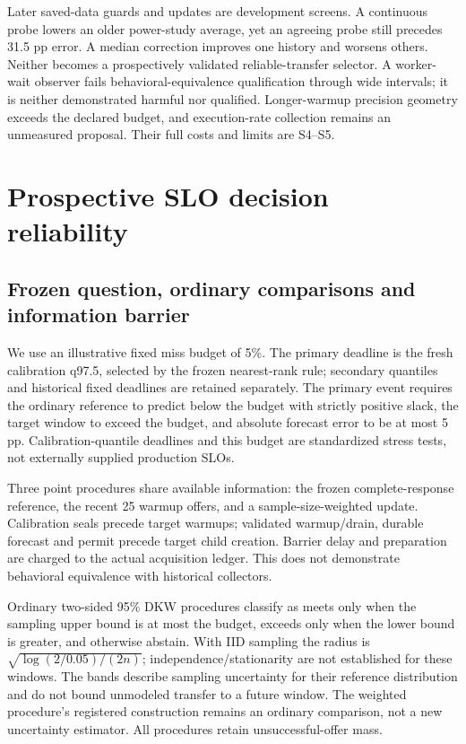\documentclass[10pt,a4paper]{article}
\begin{document}
Later saved-data guards and updates are development screens. A continuous probe lowers an older power-study average, yet an agreeing probe still precedes 31.5 pp error. A median correction improves one history and worsens others. Neither becomes a prospectively validated reliable-transfer selector. A worker-wait observer fails behavioral-equivalence qualification through wide intervals; it is neither demonstrated harmful nor qualified. Longer-warmup precision geometry exceeds the declared budget, and execution-rate collection remains an unmeasured proposal. Their full costs and limits are S4–S5.

\section{Prospective SLO decision reliability}

\subsection{Frozen question, ordinary comparisons and information barrier}

We use an illustrative fixed miss budget of 5\%. The primary deadline is the fresh calibration q97.5, selected by the frozen nearest-rank rule; secondary quantiles and historical fixed deadlines are retained separately. The primary event requires the ordinary reference to predict below the budget with strictly positive slack, the target window to exceed the budget, and absolute forecast error to be at most 5 pp. Calibration-quantile deadlines and this budget are standardized stress tests, not externally supplied production SLOs.

Three point procedures share available information: the frozen complete-response reference, the recent 25 warmup offers, and a sample-size-weighted update. Calibration seals precede target warmups; validated warmup/drain, durable forecast and permit precede target child creation. Barrier delay and preparation are charged to the actual acquisition ledger. This does not demonstrate behavioral equivalence with historical collectors.

Ordinary two-sided 95\% DKW procedures classify as meets only when the sampling upper bound is at most the budget, exceeds only when the lower bound is greater, and otherwise abstain. With IID sampling the radius is \(\sqrt{\log(2/0.05)/(2n)}\); independence/stationarity are not established for these windows. The bands describe sampling uncertainty for their reference distribution and do not bound unmodeled transfer to a future window. The weighted procedure's registered construction remains an ordinary comparison, not a new uncertainty estimator. All procedures retain unsuccessful-offer mass.
\end{document}
